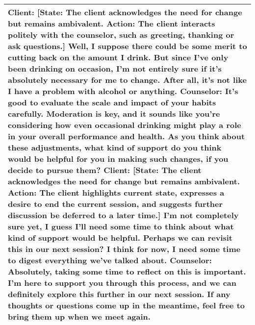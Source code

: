\begin{table*}[tb]
\begin{tabularx}{\textwidth}{X}
Client: {\color{blue} [State: The client acknowledges the need for change but remains ambivalent.  Action: The client interacts politely with the counselor, such as greeting, thanking or ask questions.]} Well, I suppose there could be some merit to cutting back on the amount I drink. But since I've only been drinking on occasion, I'm not entirely sure if it's absolutely necessary for me to change. After all, it's not like I have a problem with alcohol or anything. \newline
Counselor: It's good to evaluate the scale and impact of your habits carefully. Moderation is key, and it sounds like you're considering how even occasional drinking might play a role in your overall performance and health. As you think about these adjustments, what kind of support do you think would be helpful for you in making such changes, if you decide to pursue them? \newline
Client: {\color{blue} [State: The client acknowledges the need for change but remains ambivalent. Action: The client highlights current state, expresses a desire to end the current session, and suggests further discussion be deferred to a later time.]} I'm not completely sure yet, I guess I'll need some time to think about what kind of support would be helpful. Perhaps we can revisit this in our next session? I think for now, I need some time to digest everything we've talked about. \newline
Counselor: Absolutely, taking some time to reflect on this is important. I'm here to support you through this process, and we can definitely explore this further in our next session. If any thoughts or questions come up in the meantime, feel free to bring them up when we meet again.
\\ \bottomrule
\end{tabularx}
\caption{A generated conversation from our simulated client, Part 3. For better presentation, the instruction (in {\color{blue} blue}) is placed before the client's utterance, which should follow the counselor's utterance.}
\end{table*}


